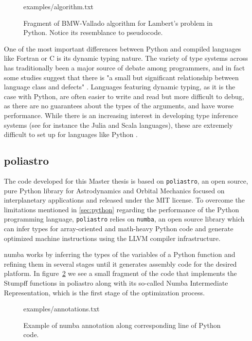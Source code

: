 \begin{figure}
\begin{lstinputlisting}[language=Python]{examples/algorithm.txt}
\end{lstinputlisting}
\caption{Fragment of BMW-Vallado algorithm for Lambert's problem in Python. Notice its resemblance to pseudocode.}
\label{fig:python}
\end{figure}

One of the most important differences between Python and compiled languages like Fortran or C is its dynamic typing nature. The variety of type systems across has traditionally been a major source of debate among programmers, and in fact some studies suggest that there is "a small but significant relationship between language class and defects" \cite{ray2014quality}. Languages featuring dynamic typing, as it is the case with Python, are often easier to write and read but more difficult to debug, as there are no guarantees about the types of the arguments, and have worse performance. While there is an increasing interest in developing type inference systems (see for instance the Julia and Scala languages), these are extremely difficult to set up for languages like Python \cite{cannon2005localized}.

\subsection{poliastro}

The code developed for this Master thesis is based on \verb|poliastro|, an open source, pure Python library for Astrodynamics and Orbital Mechanics focused on interplanetary applications and released under the MIT license\cite{cano2017poliastro}. To overcome the limitations mentioned in \ref{sec:python} regarding the performance of the Python programming language, \verb|poliastro| relies on \verb|numba|, an open source library which can infer types for array-oriented and math-heavy Python code and generate optimized machine instructions using the LLVM compiler infrastructure.

numba works by inferring the types of the variables of a Python function and refining them in several stages until it generates assembly code for the desired platform. In figure~\ref{fig:numba} we see a small fragment of the code that implements the Stumpff functions in poliastro along with its so-called Numba Intermediate Representation, which is the first stage of the optimization process.

\begin{figure}
\begin{lstinputlisting}[language=Python]{examples/annotations.txt}
\end{lstinputlisting}
\caption{Example of numba annotation along corresponding line of Python code.}
\label{fig:numba}
\end{figure}

